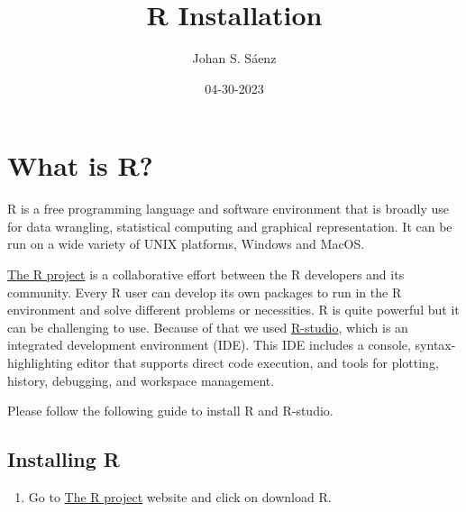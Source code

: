 \documentclass[
  letterpaper,
  DIV=11,
  numbers=noendperiod]{scrartcl}
\title{R Installation}
\author{Johan S. Sáenz}
\date{04-30-2023}
\providecommand{\tightlist}{%
  \setlength{\itemsep}{0pt}\setlength{\parskip}{0pt}}\usepackage{longtable,booktabs,array}
\renewcommand*\contentsname{Table of contents}
\newcommand\contentsname{Table of contents}
\begin{document}
\maketitle
\ifdefined\Shaded\renewenvironment{Shaded}{\begin{tcolorbox}[enhanced, boxrule=0pt, interior hidden, frame hidden, sharp corners, borderline west={3pt}{0pt}{shadecolor}, breakable]}{\end{tcolorbox}}\fi

\renewcommand*\contentsname{Table of contents}
{
\hypersetup{linkcolor=}
\setcounter{tocdepth}{3}
\tableofcontents
}
\hypertarget{what-is-r}{%
\section{\texorpdfstring{\textbf{What is
R?}}{What is R?}}\label{what-is-r}}

R is a free programming language and software environment that is
broadly use for data wrangling, statistical computing and graphical
representation. It can be run on a wide variety of UNIX platforms,
Windows and MacOS.

\href{https://www.r-project.org}{The R project} is a collaborative
effort between the R developers and its community. Every R user can
develop its own packages to run in the R environment and solve different
problems or necessities. R is quite powerful but it can be challenging
to use. Because of that we used
\href{https://posit.co/download/rstudio-desktop/}{R-studio}, which is an
integrated development environment (IDE). This IDE includes a console,
syntax-highlighting editor that supports direct code execution, and
tools for plotting, history, debugging, and workspace management.

Please follow the following guide to install R and R-studio.

\hypertarget{installing-r}{%
\subsection{Installing R}\label{installing-r}}

\begin{enumerate}
\def\labelenumi{\arabic{enumi}.}
\tightlist
\item
  Go to \href{https://www.r-project.org}{The R project} website and
  click on download R.
\end{enumerate}
\end{document}
